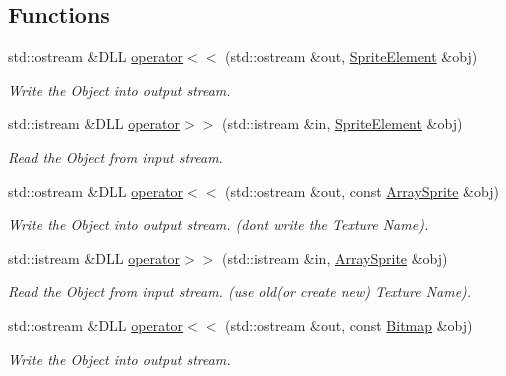 \subsection*{Functions}
\begin{DoxyCompactItemize}
\item 
std::ostream \&DLL \hyperlink{namespace_f2_c_a185179f67ee35305376ccdef2e148abb}{operator$<$$<$} (std::ostream \&out, \hyperlink{class_f2_c_1_1_sprite_element}{SpriteElement} \&obj)
\begin{DoxyCompactList}\small\item\em Write the Object into output stream. \item\end{DoxyCompactList}\item 
std::istream \&DLL \hyperlink{namespace_f2_c_aa45d16c526828f2dfbdb567c2ab858a5}{operator$>$$>$} (std::istream \&in, \hyperlink{class_f2_c_1_1_sprite_element}{SpriteElement} \&obj)
\begin{DoxyCompactList}\small\item\em Read the Object from input stream. \item\end{DoxyCompactList}\item 
std::ostream \&DLL \hyperlink{namespace_f2_c_a57872d9344e576ede8e43847b2384326}{operator$<$$<$} (std::ostream \&out, const \hyperlink{class_f2_c_1_1_array_sprite}{ArraySprite} \&obj)
\begin{DoxyCompactList}\small\item\em Write the Object into output stream. (dont write the Texture Name). \item\end{DoxyCompactList}\item 
std::istream \&DLL \hyperlink{namespace_f2_c_acec53a1cdcc68d7d5d77e7884b51c923}{operator$>$$>$} (std::istream \&in, \hyperlink{class_f2_c_1_1_array_sprite}{ArraySprite} \&obj)
\begin{DoxyCompactList}\small\item\em Read the Object from input stream. (use old(or create new) Texture Name). \item\end{DoxyCompactList}\item 
std::ostream \&DLL \hyperlink{namespace_f2_c_aeb8b225cd1a6cb0d632da0a4cf97dfef}{operator$<$$<$} (std::ostream \&out, const \hyperlink{class_f2_c_1_1_bitmap}{Bitmap} \&obj)
\begin{DoxyCompactList}\small\item\em Write the Object into output stream. \item\end{DoxyCompactList}\item 

\end{DoxyCompactItemize}
